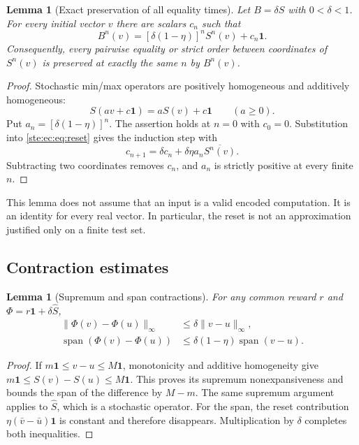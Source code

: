 \documentclass[11pt,letterpaper]{article}
\newtheorem{lemma}[theorem]{Lemma}
\theoremstyle{definition}
\theoremstyle{remark}
\newcommand{\one}{\mathbf 1}
\newcommand{\spn}{\operatorname{span}}
\begin{document}
\begin{lemma}[Exact preservation of all equality times]
\label{ste:ec:lem:reset}
Let $B=\delta\widehat S$ with $0<\delta<1$. For every initial vector $v$
there are scalars $c_n$ such that
\begin{equation}
 B^n(v)=[\delta(1-\eta)]^nS^n(v)+c_n\one.
 \label{ste:ec:eq:reset-orbit}
\end{equation}
Consequently, every pairwise equality or strict order between coordinates
of $S^n(v)$ is preserved at exactly the same $n$ by $B^n(v)$.
\end{lemma}

\begin{proof}
Stochastic min/max operators are positively homogeneous and additively
homogeneous:
\[
 S(av+c\one)=aS(v)+c\one\qquad(a\geq0).
\]
Put $a_n=[\delta(1-\eta)]^n$. The assertion holds at $n=0$ with $c_0=0$.
Substitution into \eqref{ste:ec:eq:reset} gives the induction step with
\[
 c_{n+1}=\delta c_n+\delta\eta a_n\overline{S^n(v)}.
\]
Subtracting two coordinates removes $c_n$, and $a_n$ is strictly positive
at every finite $n$.
\end{proof}

This lemma does not assume that an input is a valid encoded computation.
It is an identity for every real vector. In particular, the reset is not
an approximation justified only on a finite test set.

\subsection{Contraction estimates}

\begin{lemma}[Supremum and span contractions]
\label{ste:ec:lem:contraction}
For any common reward $r$ and $\Phi=r\one+\delta\widehat S$,
\begin{align}
 \|\Phi(v)-\Phi(u)\|_\infty&\leq\delta\|v-u\|_\infty,
 \label{ste:ec:eq:sup-contract}\\
 \spn(\Phi(v)-\Phi(u))&\leq\delta(1-\eta)\spn(v-u).
 \label{ste:ec:eq:span-contract}
\end{align}
\end{lemma}

\begin{proof}
If $m\one\leq v-u\leq M\one$, monotonicity and additive homogeneity give
$m\one\leq S(v)-S(u)\leq M\one$. This proves its supremum nonexpansiveness
and bounds the span of the difference by $M-m$. The same supremum argument
applies to $\widehat S$, which is a stochastic operator. For the span,
the reset contribution $\eta(\bar v-\bar u)\one$ is constant and therefore
disappears. Multiplication by $\delta$ completes both inequalities.
\end{proof}
\end{document}
